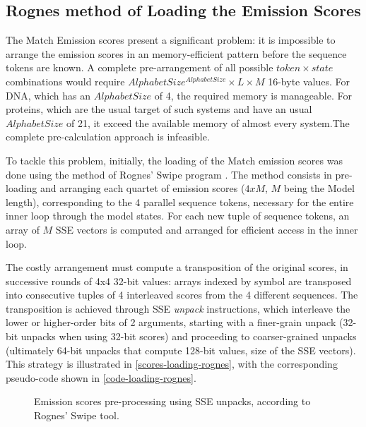 \subsection{Rognes method of Loading the Emission Scores}

The Match Emission scores present a significant problem: it is impossible to arrange the emission scores in an memory-efficient pattern before the sequence tokens are known. A complete pre-arrangement of all possible $token \times state$ combinations would require $AlphabetSize^{AlphabetSize} \times L \times M$ 16-byte values. For DNA, which has an $AlphabetSize$ of 4, the required memory is manageable. For proteins, which are the usual target of such systems and have an usual $AlphabetSize$ of 21, it exceed the available memory of almost every system.The complete pre-calculation approach is infeasible.

To tackle this problem, initially, the loading of the Match emission scores was done using the method of Rognes' Swipe program \cite{rognes2011}. The method consists in pre-loading and arranging each quartet of emission scores ($4xM$, $M$ being the Model length), corresponding to the 4 parallel sequence tokens, necessary for the entire inner loop through the model states. For each new tuple of sequence tokens, an array of $M$ SSE vectors is computed and arranged for efficient access in the inner loop.

The costly arrangement must compute a transposition of the original scores, in successive rounds of 4x4 32-bit values: arrays indexed by symbol are transposed into consecutive tuples of 4 interleaved scores from the 4 different sequences. The transposition is achieved through SSE \emph{unpack} instructions, which interleave the lower or higher-order bits of 2 arguments, starting with a finer-grain unpack (32-bit unpacks when using 32-bit scores) and proceeding to coarser-grained unpacks (ultimately 64-bit unpacks that compute 128-bit values, size of the SSE vectors). This strategy is illustrated in \autoref{scores-loading-rognes}, with the corresponding pseudo-code shown in \cref{code-loading-rognes}.


\begin{figure}[htb!]
  \begin{center}
    \caption[Loading of Emission scores] {Emission scores pre-processing using SSE unpacks, according to Rognes' Swipe tool.}
    \label{scores-loading-rognes}
  \end{center}
\end{figure}


